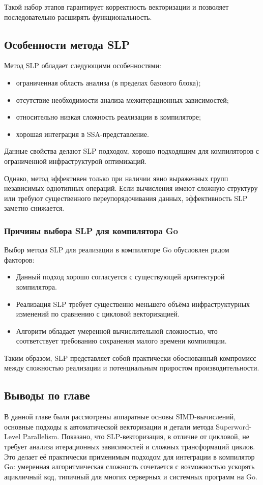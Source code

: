 Такой набор этапов гарантирует корректность векторизации и позволяет последовательно расширять функциональность.

\subsection{Особенности метода SLP}

Метод SLP обладает следующими особенностями:
\begin{itemize}
    \item ограниченная область анализа (в пределах базового блока);
    \item отсутствие необходимости анализа межитерационных зависимостей;
    \item относительно низкая сложность реализации в компиляторе;
    \item хорошая интеграция в SSA-представление.
\end{itemize}

Данные свойства делают SLP подходом, хорошо подходящим для компиляторов с ограниченной инфраструктурой оптимизаций.

Однако, метод эффективен только при наличии явно выраженных групп независимых однотипных операций. 
Если вычисления имеют сложную структуру или требуют существенного переупорядочивания данных,
эффективность SLP заметно снижается.

\subsubsection{Причины выбора SLP для компилятора Go}
Выбор метода SLP для реализации в компиляторе Go обусловлен рядом факторов:
\begin{itemize}
    \item Данный подход хорошо согласуется с существующей архитектурой компилятора.
    \item Реализация SLP требует существенно меньшего объёма инфраструктурных изменений по сравнению с цикловой векторизацией.
    \item Алгоритм обладает умеренной вычислительной сложностью, что соответствует требованию сохранения малого времени компиляции.
\end{itemize}

Таким образом, SLP представляет собой практически обоснованный компромисс между сложностью реализации и потенциальным приростом производительности.

\subsection{Выводы по главе}
В данной главе были рассмотрены аппаратные основы SIMD-вычислений, основные подходы к автоматической векторизации и детали метода Superword-Level Parallelism.
Показано, что SLP-векторизация, в отличие от цикловой, не требует анализа итерационных зависимостей и сложных трансформаций циклов. Это делает её практически применимым подходом для интеграции в компилятор Go: умеренная алгоритмическая сложность сочетается с возможностью ускорять ацикличный код, типичный для многих серверных и системных программ на Go.

